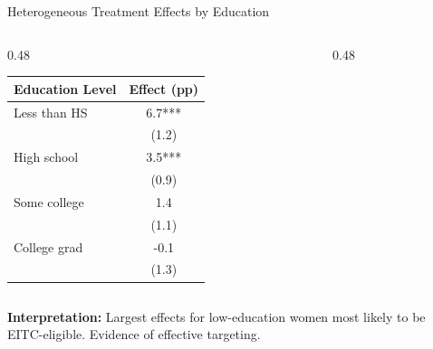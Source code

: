 \documentclass[aspectratio=169]{beamer}
\begin{document}
\begin{frame}{Heterogeneous Treatment Effects by Education}
\begin{columns}
\begin{column}{0.48\textwidth}
\begin{table}
\centering
\small
\begin{tabular}{lc}
\toprule
\textbf{Education Level} & \textbf{Effect (pp)} \\
\midrule
Less than HS & 6.7*** \\
 & (1.2) \\
\addlinespace
High school & 3.5*** \\
 & (0.9) \\
\addlinespace
Some college & 1.4 \\
 & (1.1) \\
\addlinespace
College grad & -0.1 \\
 & (1.3) \\
\bottomrule
\end{tabular}
\end{table}
\end{column}

\begin{column}{0.48\textwidth}
\end{column}
\end{columns}

\vspace{0.3cm}
\small
\textbf{Interpretation:} Largest effects for low-education women most likely to be EITC-eligible. Evidence of effective targeting.
\end{frame}
\end{document}
